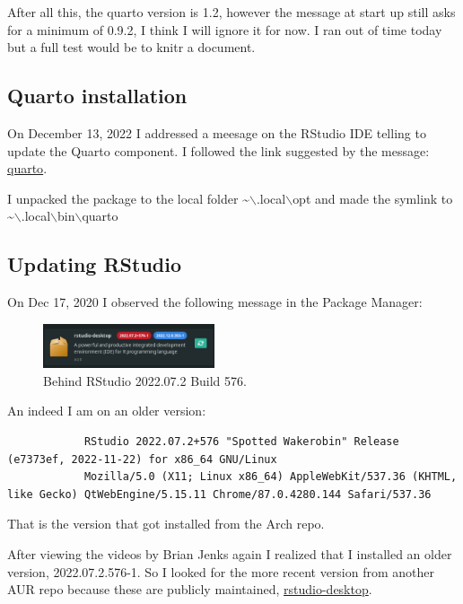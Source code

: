 \documentclass[]{scrartcl}
\begin{document}
	After all this, the quarto version is 1.2, however the message at start up still asks for a minimum of 0.9.2, I think I will ignore it for now.
	I ran out of time today but a full test would be to knitr a document.
	 
	
	\subsection{Quarto installation}
	
	On December 13, 2022 I addressed a meesage on the RStudio IDE telling to update the Quarto component.
	I followed the link suggested by the message: \href{https://quarto.org/docs/download/tarball.html?version=1.2.269&idPrefix=download}{quarto}.
	
	I unpacked the package to the local folder \textasciitilde$\backslash$.local$\backslash$opt 
	and made the symlink to \textasciitilde$\backslash$.local$\backslash$bin$\backslash$quarto
	
	
	\subsection{Updating RStudio}
	
	On Dec 17, 2020 I observed the following message in the Package Manager:
	
	\begin{figure}[!htb]
		\centering
		\caption{Behind RStudio 2022.07.2 Build 576.}
		\includegraphics[width=0.45\textwidth]{Images/RStudio-failing-update-throughPckMngr.png}
	\end{figure}
	
	An indeed I am on an older version:
	\begin{tiny}
		\begin{verbatim}
			RStudio 2022.07.2+576 "Spotted Wakerobin" Release (e7373ef, 2022-11-22) for x86_64 GNU/Linux
			Mozilla/5.0 (X11; Linux x86_64) AppleWebKit/537.36 (KHTML, like Gecko) QtWebEngine/5.15.11 Chrome/87.0.4280.144 Safari/537.36
		\end{verbatim}
	\end{tiny}
	
	That is the version that got installed from the Arch repo.
	
	After viewing the videos by Brian Jenks again I realized that I installed an older version, 2022.07.2.576-1. So I looked for the  more recent version from another AUR repo because these are
	publicly maintained, \href{https://aur.archlinux.org/packages/rstudio-desktop}{rstudio-desktop}.
	
\end{document}
